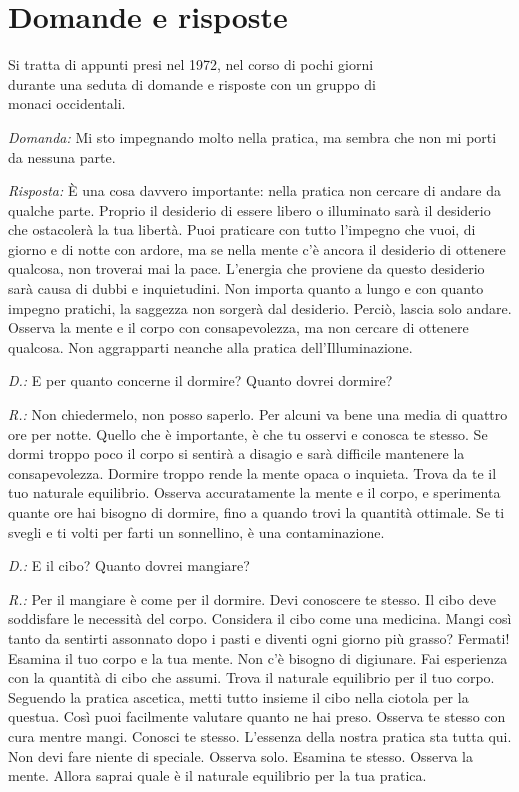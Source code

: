 \chapter{Domande e risposte}

\begin{openingQuote}
  \centering

  Si tratta di appunti presi nel 1972, nel corso di pochi giorni\\
  durante una seduta di domande e risposte con un gruppo di\\
  monaci occidentali.
\end{openingQuote}

\emph{Domanda:} Mi sto impegnando molto nella pratica, ma sembra che non mi
porti da nessuna parte.

\emph{Risposta:} È una cosa davvero importante: nella pratica non cercare di
andare da qualche parte. Proprio il desiderio di essere libero o
illuminato sarà il desiderio che ostacolerà la tua libertà. Puoi
praticare con tutto l'impegno che vuoi, di giorno e di notte con ardore,
ma se nella mente c'è ancora il desiderio di ottenere qualcosa, non
troverai mai la pace. L'energia che proviene da questo desiderio sarà
causa di dubbi e inquietudini. Non importa quanto a lungo e con quanto
impegno pratichi, la saggezza non sorgerà dal desiderio. Perciò, lascia
solo andare. Osserva la mente e il corpo con consapevolezza, ma non
cercare di ottenere qualcosa. Non aggrapparti neanche alla pratica
dell'Illuminazione.

\emph{D.:} E per quanto concerne il dormire? Quanto dovrei dormire?

\emph{R.:} Non chiedermelo, non posso saperlo. Per alcuni va bene una media di
quattro ore per notte. Quello che è importante, è che tu osservi e
conosca te stesso. Se dormi troppo poco il corpo si sentirà a disagio e
sarà difficile mantenere la consapevolezza. Dormire troppo rende la
mente opaca o inquieta. Trova da te il tuo naturale equilibrio. Osserva
accuratamente la mente e il corpo, e sperimenta quante ore hai bisogno
di dormire, fino a quando trovi la quantità ottimale. Se ti svegli e ti
volti per farti un sonnellino, è una contaminazione.

\emph{D.:} E il cibo? Quanto dovrei mangiare?

\emph{R.:} Per il mangiare è come per il dormire. Devi conoscere te stesso. Il
cibo deve soddisfare le necessità del corpo. Considera il cibo come una
medicina. Mangi così tanto da sentirti assonnato dopo i pasti e diventi
ogni giorno più grasso? Fermati! Esamina il tuo corpo e la tua mente.
Non c'è bisogno di digiunare. Fai esperienza con la quantità di cibo che
assumi. Trova il naturale equilibrio per il tuo corpo. Seguendo la
pratica ascetica, metti tutto insieme il cibo nella ciotola per la
questua. Così puoi facilmente valutare quanto ne hai preso. Osserva te
stesso con cura mentre mangi. Conosci te stesso. L'essenza della nostra
pratica sta tutta qui. Non devi fare niente di speciale. Osserva solo.
Esamina te stesso. Osserva la mente. Allora saprai quale è il naturale
equilibrio per la tua pratica.

